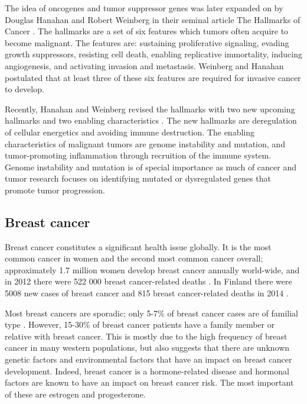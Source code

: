 The idea of oncogenes and tumor suppressor genes was later expanded on by
Douglas Hanahan and Robert Weinberg in their seminal article The Hallmarks of
Cancer \citep{Hanahan2000}. The hallmarks are a set of six features which
tumors often acquire to become malignant. The features are: sustaining
proliferative signaling, evading growth suppressors, resisting cell death,
enabling replicative immortality, inducing angiogenesis, and activating
invasion and metastasis. Weinberg and Hanahan postulated that at least three
of these six features are required for invasive cancer to develop.

Recently, Hanahan and Weinberg revised the hallmarks with two new upcoming
hallmarks and two enabling characteristics \citep{Hanahan2011}. The new
hallmarks are deregulation of cellular energetics and avoiding immune
destruction. The enabling characteristics of malignant tumors are genome
instability and mutation, and tumor-promoting inflammation through recruition
of the immune system. Genome instability and mutation is of special importance
as much of cancer and tumor research focuses on identifying mutated or
dysregulated genes that promote tumor progression.



\subsection{Breast cancer}\label{breast-cancer}

Breast cancer constitutes a significant health issue globally. It is the most
common cancer in women and the second most common cancer overall;
approximately 1.7 million women develop breast cancer annually world-wide, and
in 2012 there were 522 000 breast cancer-related deaths
\citep{Ferlay2015}. In Finland there were 5008 new cases of breast cancer
 and 815 breast cancer-related deaths in 2014 \citep{Syoparekisteri}.

Most breast cancers are sporadic; only 5-7\% of breast cancer cases are of
familial type \citep{Melchor2013}. However, 15-30\% of breast cancer patients
have a family member or relative with breast cancer. This is
mostly due to the high frequency of breast cancer in many western populations,
but also suggests that there are unknown genetic factors and environmental
factors that have an impact on breast cancer development. Indeed, breast
cancer is a hormone-related disease and hormonal factors are known to have an
impact on breast cancer risk. The most important of these are
estrogen and progesterone.

